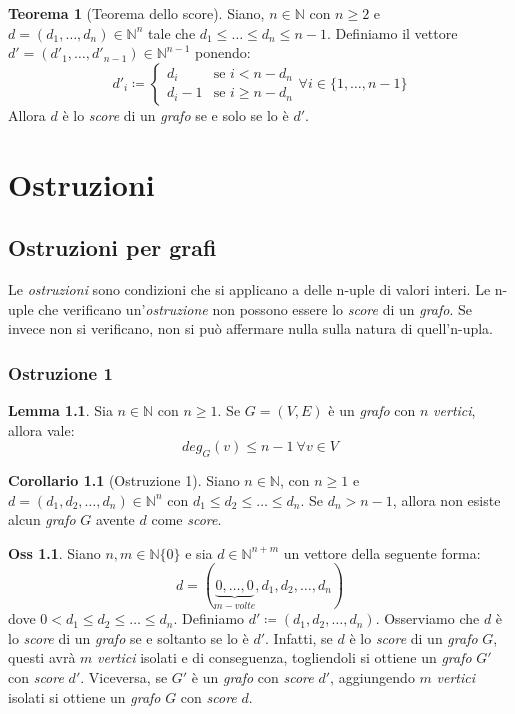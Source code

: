 \documentclass[12pt, a4paper]{report}
\newcommand{\N}{\mathbb{N}}
\theoremstyle{definition}
\newtheorem{theorem}{Teorema}[section]
\newtheorem{corollary}{Corollario}[section]
\newtheorem{lemma}{Lemma}[section]
\newtheorem{observation}{Oss}[section]
\begin{document}
\begin{theorem}[Teorema dello score]
    Siano, $n\in\N$ con $n\geq 2$ e $d=(d_1,\dots,d_n)\in\N^n$ tale che $d_1\leq
    \dots\leq d_n\leq n-1$. Definiamo il vettore $d'=(d'_1,\dots,d'_{n-1})\in\N^{n-1}$
    ponendo:
    \[d'_i\coloneqq\begin{cases}
        d_i & \text{se } i<n-d_n\\
        d_i-1 & \text{se } i\geq n-d_n
    \end{cases}\forall i\in\{1,\dots,n-1\}\]
    Allora $d$ è lo \emph{score} di un \emph{grafo} se e solo se lo è $d'$.
\end{theorem}

\chapter{Ostruzioni}
\section{Ostruzioni per grafi}
Le \emph{ostruzioni} sono condizioni che si applicano a delle n-uple di valori
interi. Le n-uple che verificano un'\emph{ostruzione} non possono essere lo
\emph{score} di un \emph{grafo}. Se invece non si verificano, non si può affermare
nulla sulla natura di quell'n-upla.

\subsection{Ostruzione 1}
\begin{lemma}
    Sia $n\in\N$ con $n\geq 1$. Se $G=(V,E)$ è un \emph{grafo} con $n$ \emph{vertici},
    allora vale:
    \[deg_G(v)\leq n-1\ \forall v\in V\]
\end{lemma}
\begin{corollary}[Ostruzione 1]
    Siano $n\in\N$, con $n\geq 1$ e $d=(d_1,d_2,\dots,d_n)\in\N^n$ con $d_1\leq d_2
    \leq\dots\leq d_n$. Se $d_n>n-1$, allora non esiste alcun \emph{grafo} $G$
    avente $d$ come \emph{score}.
\end{corollary}

\begin{observation}
    Siano $n,m\in\N\{0\}$ e sia $d\in\N^{n+m}$ un vettore della seguente forma:
    \[d=(\underbrace{0,\dots,0}_{m-volte},d_1,d_2,\dots,d_n)\]
    dove $0<d_1\leq d_2\leq\dots\leq d_n$. Definiamo $d'\coloneqq(d_1,d_2,\dots,d_n)$.
    Osserviamo che $d$ è lo \emph{score} di un \emph{grafo} se e soltanto se lo è
    $d'$. Infatti, se $d$ è lo \emph{score} di un \emph{grafo} $G$, questi avrà $m$
    \emph{vertici} isolati e di conseguenza, togliendoli si ottiene un \emph{grafo}
    $G'$ con \emph{score} $d'$. Viceversa, se $G'$ è un \emph{grafo} con \emph{score}
    $d'$, aggiungendo $m$ \emph{vertici} isolati si ottiene un \emph{grafo} $G$ con
    \emph{score} $d$.
\end{observation}
\end{document}
